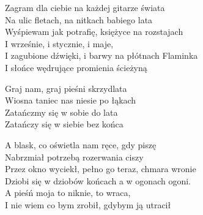 
\begin{text}
    Zagram dla ciebie na każdej gitarze świata\\
    Na ulic fletach, na nitkach babiego lata\\
    Wyśpiewam jak potrafię, księżyce na rozstajach\\
    I wrześnie, i stycznie, i maje,\\
    I zagubione dźwięki, i barwy na płótnach Flaminka\\
    I słońce wędrujące promienia ścieżyną

    \vin Graj nam, graj pieśni skrzydlata\\
    \vin Wiosna taniec nas niesie po łąkach\\
    \vin Zatańczmy się w sobie do lata\\
    \vin Zatańczy się w siebie bez końca

    A blask, co oświetla nam ręce, gdy piszę\\
    Nabrzmiał potrzebą rozerwania ciszy\\
    Przez okno wyciekł, pełno go teraz, chmara wronie\\
    Dziobi się w dziobów końcach a w ogonach ogoni.\\
    A pieśń moja to niknie, to wraca,\\
    I nie wiem co bym zrobił, gdybym ją utracił
\end{text}
\begin{chord}

\end{chord}